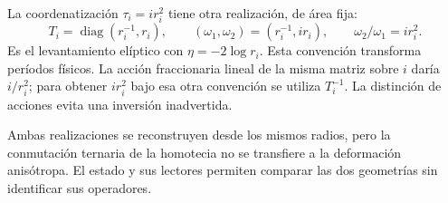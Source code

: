 La coordenatización \(\tau_i=ir_i^2\) tiene otra realización, de área fija:
\[
 T_i=\operatorname{diag}(r_i^{-1},r_i),\qquad
 (\omega_1,\omega_2)=(r_i^{-1},ir_i),\qquad
 \omega_2/\omega_1=ir_i^2.
\]
Es el levantamiento elíptico con \(\eta=-2\log r_i\). Esta convención transforma períodos físicos. La acción fraccionaria lineal de la misma matriz sobre \(i\) daría \(i/r_i^2\); para obtener \(ir_i^2\) bajo esa otra convención se utiliza \(T_i^{-1}\). La distinción de acciones evita una inversión inadvertida.

Ambas realizaciones se reconstruyen desde los mismos radios, pero la conmutación ternaria de la homotecia no se transfiere a la deformación anisótropa. El estado y sus lectores permiten comparar las dos geometrías sin identificar sus operadores.
